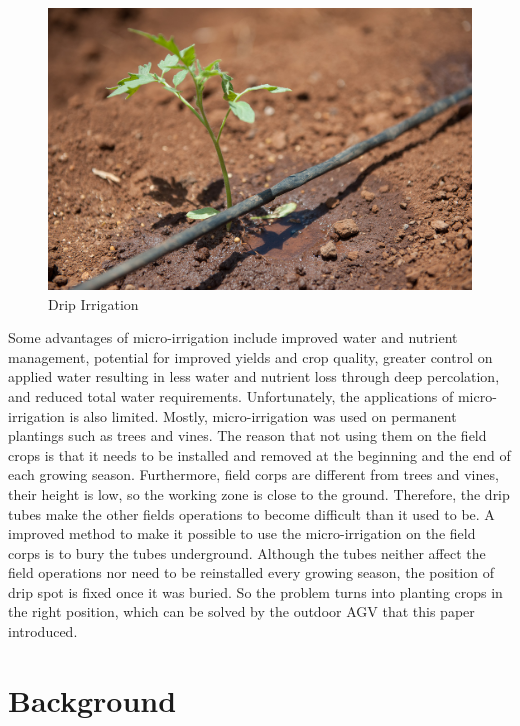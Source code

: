 \documentclass[letterpaper,12pt,oneside]{book}
\begin{document}
		\begin{figure}[ht!]
			\begin{center}
				\includegraphics[scale = 0.25]{drip.jpg}
				\caption{Drip Irrigation}
			\end{center}
		\end{figure}
		Some advantages of micro-irrigation include improved water and nutrient management, potential for improved yields and crop quality, greater control on applied water resulting in less water and nutrient loss through deep percolation, and reduced total water requirements. \cite{phene1986advantages} Unfortunately, the applications of micro-irrigation is also limited. Mostly, micro-irrigation was used on permanent plantings such as trees and vines. The reason that not using them on the field crops is that it needs to be installed and removed at the beginning and the end of each growing season. Furthermore, field corps are different from trees and vines, their height is low, so the working zone is close to the ground. Therefore, the drip tubes make the other fields operations to become difficult than it used to be. A improved method to make it possible to use the micro-irrigation on the field corps is to bury the tubes underground. \cite{camp1998subsurface} Although the tubes neither affect the field operations nor need to be reinstalled every growing season, the position of drip spot is fixed once it was buried. So the problem turns into planting crops in the right position, which can be solved by the outdoor AGV that this paper introduced. 
		
		\chapter{Background}
		
\end{document}
